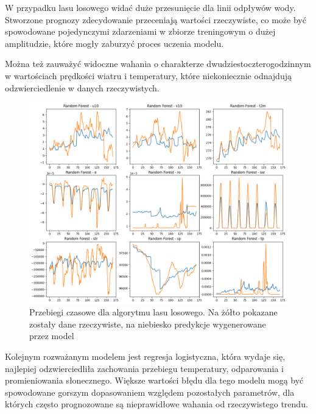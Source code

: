W przypadku lasu losowego widać duże przesunięcie dla linii odpływów wody. Stworzone prognozy zdecydowanie
przeceniają wartości rzeczywiste, co może być spowodowane pojedynczymi zdarzeniami w zbiorze treningowym o
dużej amplitudzie, które mogły zaburzyć proces uczenia modelu.

Można też zauważyć widoczne wahania o charakterze dwudziestoczterogodzinnym w wartościach 
prędkości wiatru i temperatury, które niekoniecznie odnajdują odzwierciedlenie w danych rzeczywistych.

\begin{figure}[H]
    \centering
    \includegraphics[width=\textwidth]{images/random_forest_week.png}
    \caption{Przebiegi czasowe dla algorytmu lasu losowego. Na żółto pokazane zostały dane 
    rzeczywiste, na niebiesko predykcje wygenerowane przez model}
    \label{forest-week}
\end{figure}

Kolejnym rozważanym modelem jest regresja logistyczna, która wydaje się, najlepiej odzwierciedliła 
zachowania przebiegu temperatury, odparowania i promieniowania słonecznego. Większe wartości 
błędu dla tego modelu mogą być spowodowane gorszym dopasowaniem względem pozostałych parametrów, dla których
często prognozowane są nieprawidłowe wahania od rzeczywistego trendu.

